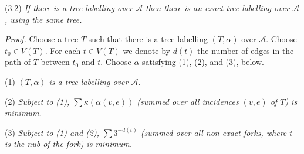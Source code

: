 \stmt
(3.2) \textit{If there is a tree-labelling over $\mathscr{A}$ then there is an exact tree-labelling over $\mathscr{A}$, using the same tree.}

\textit{Proof.} Choose a tree $T$ such that there is a tree-labelling $(T, \alpha)$ over $\mathscr{A}$. Choose $t_0\in V(T)$. For each $t\in V(T)$ we denote by $d(t)$ the number of edges in the path of $T$ between $t_0$ and $t$. Choose $\alpha$ satisfying (1), (2), and (3), below.

\hspace*{12pt}(1) \textit{$(T, \alpha)$ is a tree-labelling over $\mathscr{A}$.}

\hspace*{12pt}(2) \textit{Subject to (1), $\sum \kappa(\alpha(v, e))$ (summed over all incidences $(v, e)$ of $T$) is minimum.}

\hspace*{12pt}(3) \textit{Subject to (1) and (2), $\sum 3^{-d(t)}$ (summed over all non-exact forks, where $t$ is the nub of the fork) is minimum.}
